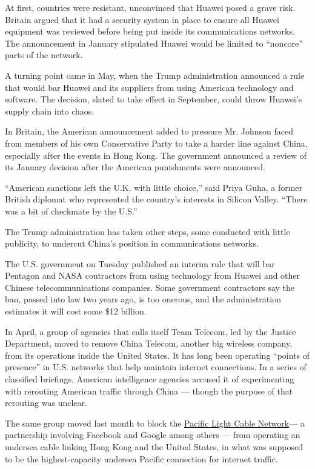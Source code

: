 At first, countries were resistant, unconvinced that Huawei posed a
grave risk. Britain argued that it had a security system in place to
ensure all Huawei equipment was reviewed before being put inside its
communications networks. The announcement in January stipulated Huawei
would be limited to ``noncore'' parts of the network.

A turning point came in May, when the Trump administration announced a
rule that would bar Huawei and its suppliers from using American
technology and software. The decision, slated to take effect in
September, could throw Huawei's supply chain into chaos.

In Britain, the American announcement added to pressure Mr. Johnson
faced from members of his own Conservative Party to take a harder line
against China, especially after the events in Hong Kong. The government
announced a review of its January decision after the American
punishments were announced.

``American sanctions left the U.K. with little choice,'' said Priya
Guha, a former British diplomat who represented the country's interests
in Silicon Valley. ``There was a bit of checkmate by the U.S.''

The Trump administration has taken other steps, some conducted with
little publicity, to undercut China's position in communications
networks.

The U.S. government on Tuesday published an interim rule that will bar
Pentagon and NASA contractors from using technology from Huawei and
other Chinese telecommunications companies. Some government contractors
say the ban, passed into law two years ago, is too onerous, and the
administration estimates it will cost some \$12 billion.

In April, a group of agencies that calls itself Team Telecom, led by the
Justice Department, moved to remove China Telecom, another big wireless
company, from its operations inside the United States. It has long been
operating ``points of presence'' in U.S. networks that help maintain
internet connections. In a series of classified briefings, American
intelligence agencies accused it of experimenting with rerouting
American traffic through China --- though the purpose of that rerouting
was unclear.

The same group moved last month to block the
\href{https://pldcglobal.com/}{Pacific Light Cable Network}--- a
partnership involving Facebook and Google among others --- from
operating an undersea cable linking Hong Kong and the United States, in
what was supposed to be the highest-capacity undersea Pacific connection
for internet traffic.

